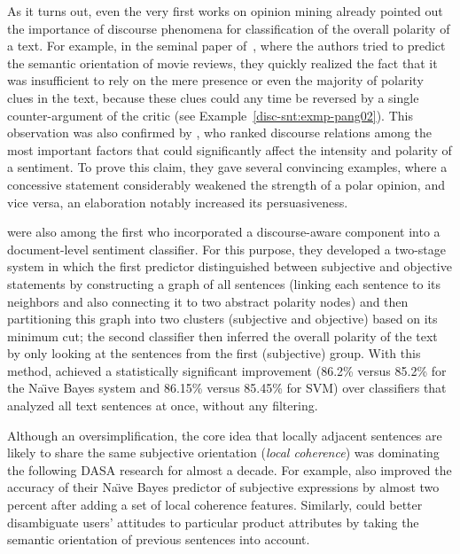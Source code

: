\documentclass[11pt]{article}
\begin{document}
As it turns out, even the very first works on opinion mining already
pointed out the importance of discourse phenomena for classification
of the overall polarity of a text.  For example, in the seminal paper
of~, where the authors tried to predict the semantic
orientation of movie reviews, they quickly realized the fact that it
was insufficient to rely on the mere presence or even the majority of
polarity clues in the text, because these clues could any time be
reversed by a single counter-argument of the critic (see
Example~\ref{disc-snt:exmp-pang02}).  This observation was also
confirmed by , who ranked discourse relations among
the most important factors that could significantly affect the
intensity and polarity of a sentiment.  To prove this claim, they gave
several convincing examples, where a concessive statement considerably
weakened the strength of a polar opinion, and vice versa, an
elaboration notably increased its persuasiveness.

 were also among the first who incorporated a
discourse-aware component into a document-level sentiment classifier.
For this purpose, they developed a two-stage system in which the first
predictor distinguished between subjective and objective statements by
constructing a graph of all sentences (linking each sentence to its
neighbors and also connecting it to two abstract polarity nodes) and
then partitioning this graph into two clusters (subjective and
objective) based on its minimum cut; the second classifier then
inferred the overall polarity of the text by only looking at the
sentences from the first (subjective) group.  With this method,
 achieved a statistically significant improvement
(86.2\% versus 85.2\% for the Na\"{\i}ve Bayes system and 86.15\%
versus 85.45\% for SVM) over classifiers that analyzed all text
sentences at once, without any filtering.

Although an oversimplification, the core idea that locally adjacent
sentences are likely to share the same subjective orientation
(\emph{local coherence}) was dominating the following DASA research
for almost a decade.  For example,  also improved the
accuracy of their Na\"{\i}ve Bayes predictor of subjective expressions
by almost two percent after adding a set of local coherence features.
Similarly,  could better disambiguate users' attitudes to
particular product attributes by taking the semantic orientation of
previous sentences into account.
\end{document}
